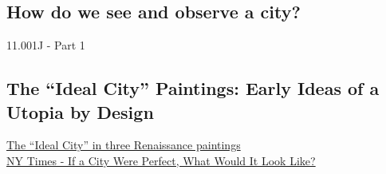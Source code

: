 \documentclass{article}
\begin{document}
        \subsection{How do we see and observe a city?}
        \small 11.001J - Part 1
        \normalsize 
        \begin{outline}
            
        \end{outline}
        \subsection{The ``Ideal City'' Paintings: Early Ideas of a Utopia by Design}
        \small{\href{https://www.archiobjects.org/the-ideal-city-in-three-renaissance-paintings/}{The “Ideal City” in three Renaissance paintings}}\\
        \small{\href{https://www.nytimes.com/2012/05/09/arts/09iht-conway09.html}{NY Times - If a City Were Perfect, What Would It Look Like?}}
        \normalsize 
\end{document}
